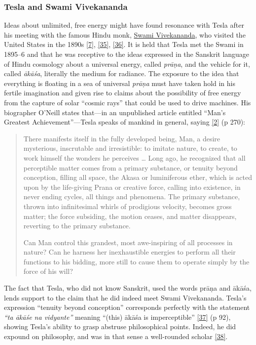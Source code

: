 \documentclass[
  12pt,
  british,
  a4paper,
  rgb,
  dvipsnames,
  svgnames,
  hyphens]{article}
\begin{document}
\hypertarget{tesla-and-swami-vivekananda}{%
\subsubsection{Tesla and Swami
Vivekananda}\label{tesla-and-swami-vivekananda}}

Ideas about unlimited, free energy might have found resonance with Tesla
after his meeting with the famous Hindu monk,
\href{https://en.wikipedia.org/wiki/Swami_Vivekananda}{Swami
Vivekananda}, who visited the United States in the 1890s
\protect\hyperlink{ref-tesla-home}{{[}7{]}},
\protect\hyperlink{ref-grotz}{{[}35{]}},
\protect\hyperlink{ref-dobson}{{[}36{]}}. It is held that Tesla met the
Swami in 1895--6 and that he was receptive to the ideas expressed in the
Sanskrit language of Hindu cosmology about a universal energy, called
\emph{prāṇa}, and the vehicle for it, called \emph{ākāśa}, literally the
medium for radiance. The exposure to the idea that everything is
floating in a sea of universal \emph{prāṇa} must have taken hold in his
fertile imagination and given rise to claims about the possibility of
free energy from the capture of solar ``cosmic rays'' that could be used
to drive machines. His biographer O'Neill states that---in an
unpublished article entitled ``Man's Greatest Achievement''---Tesla
speaks of mankind in general, saying
\protect\hyperlink{ref-oneill80}{{[}2{]}} (p 270):

\begin{quote}
There manifests itself in the fully developed being, Man, a desire
mysterious, inscrutable and irresistible: to imitate nature, to create,
to work himself the wonders he perceives \ldots{} Long ago, he
recognized that all perceptible matter comes from a primary substance,
or tenuity beyond conception, filling all space, the Akasa or
luminiferous ether, which is acted upon by the life-giving Prana or
creative force, calling into existence, in never ending cycles, all
things and phenomena. The primary substance, thrown into infinitesimal
whirls of prodigious velocity, becomes gross matter; the force
subsiding, the motion ceases, and matter disappears, reverting to the
primary substance.

Can Man control this grandest, most awe-inspiring of all processes in
nature? Can he harness her inexhaustible energies to perform all their
functions to his bidding, more still to cause them to operate simply by
the force of his will?
\end{quote}

The fact that Tesla, who did not know Sanskrit, used the words prāṇa and
ākāśa, lends support to the claim that he did indeed meet Swami
Vivekananda. Tesla's expression ``tenuity beyond conception''
corresponds perfectly with the statement \emph{``ta ākāśe na vidyante''}
meaning ``(this) ākāśa is imperceptible''
\protect\hyperlink{ref-agra01}{{[}37{]}} (p 92), showing Tesla's ability
to grasp abstruse philosophical points. Indeed, he did expound on
philosophy, and was in that sense a well-rounded scholar
\protect\hyperlink{ref-tesla-cosmic}{{[}38{]}}.
\end{document}
